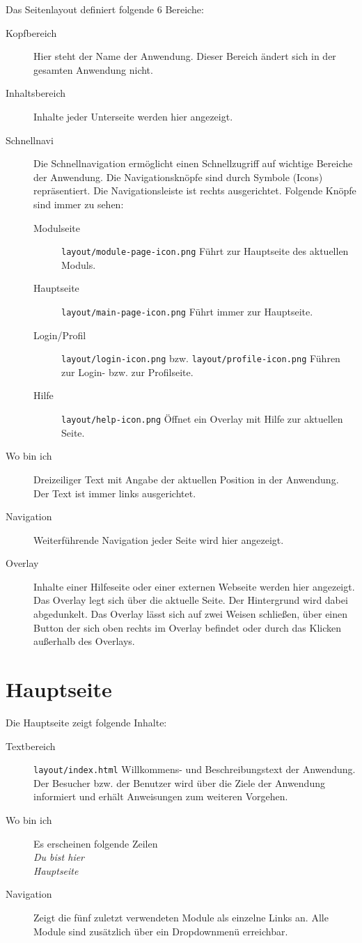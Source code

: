 Das Seitenlayout definiert folgende 6 Bereiche:
\begin{description}
  \item[Kopfbereich] Hier steht der Name der Anwendung. Dieser Bereich ändert sich in der gesamten Anwendung nicht.
  \item[Inhaltsbereich] Inhalte jeder Unterseite werden hier angezeigt.
  \item[Schnellnavi] Die Schnellnavigation ermöglicht einen Schnellzugriff auf wichtige Bereiche der Anwendung. Die Navigationsknöpfe sind durch Symbole (Icons) repräsentiert. Die Navigationsleiste ist rechts ausgerichtet. Folgende Knöpfe sind immer zu sehen:
  \begin{description}
    \item[Modulseite] \texttt{layout/module-page-icon.png} Führt zur Hauptseite des aktuellen Moduls. 
    \item[Hauptseite] \texttt{layout/main-page-icon.png} Führt immer zur Hauptseite. 
    \item[Login/Profil] \texttt{layout/login-icon.png} bzw. \texttt{layout/profile-icon.png} Führen zur Login- bzw. zur Profilseite. 
    \item[Hilfe] \texttt{layout/help-icon.png} Öffnet ein Overlay mit Hilfe zur aktuellen Seite. 
  \end{description}
  
  \item[Wo bin ich] Dreizeiliger Text mit Angabe der aktuellen Position in der Anwendung. Der Text ist immer links ausgerichtet.
  \item[Navigation] Weiterführende Navigation jeder Seite wird hier angezeigt.
  \item[Overlay] Inhalte einer Hilfeseite oder einer externen Webseite werden hier angezeigt.
	Das Overlay legt sich über die aktuelle Seite. Der Hintergrund wird dabei abgedunkelt. 
	Das Overlay lässt sich auf zwei Weisen schließen, über einen Button der sich oben rechts im Overlay befindet oder durch das Klicken außerhalb des Overlays.
\end{description}


%
%
%
\section{Hauptseite}
\label{sec:main-page}

Die Hauptseite zeigt folgende Inhalte:
\begin{description}
  \item[Textbereich] \texttt{layout/index.html} Willkommens- und Beschreibungstext der Anwendung. Der Besucher bzw. der Benutzer wird über die Ziele der Anwendung informiert und erhält Anweisungen zum weiteren Vorgehen.
  \item[Wo bin ich] Es erscheinen folgende Zeilen \emph{\\Du bist hier \\Hauptseite}
  \item[Navigation] Zeigt die fünf zuletzt verwendeten Module als einzelne Links an. Alle Module sind zusätzlich über ein Dropdownmenü erreichbar.
	
\end{description}




